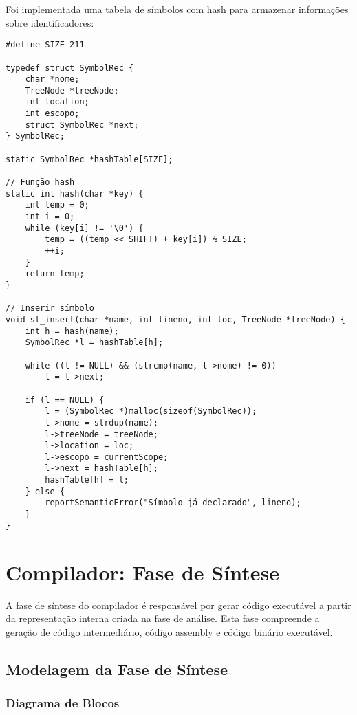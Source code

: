 \documentclass[
	12pt,				%
	oneside,
	a4paper,			%
	english,			%
	french,				%
	spanish,			%
	brazil,				%
	]{abntex2}
\begin{document}
Foi implementada uma tabela de símbolos com hash para armazenar informações sobre identificadores:

\begin{lstlisting}[style=cstyle, caption=Implementação da tabela de símbolos]
#define SIZE 211

typedef struct SymbolRec {
    char *nome;
    TreeNode *treeNode;
    int location;
    int escopo;
    struct SymbolRec *next;
} SymbolRec;

static SymbolRec *hashTable[SIZE];

// Função hash
static int hash(char *key) {
    int temp = 0;
    int i = 0;
    while (key[i] != '\0') {
        temp = ((temp << SHIFT) + key[i]) % SIZE;
        ++i;
    }
    return temp;
}

// Inserir símbolo
void st_insert(char *name, int lineno, int loc, TreeNode *treeNode) {
    int h = hash(name);
    SymbolRec *l = hashTable[h];
    
    while ((l != NULL) && (strcmp(name, l->nome) != 0))
        l = l->next;
        
    if (l == NULL) {
        l = (SymbolRec *)malloc(sizeof(SymbolRec));
        l->nome = strdup(name);
        l->treeNode = treeNode;
        l->location = loc;
        l->escopo = currentScope;
        l->next = hashTable[h];
        hashTable[h] = l;
    } else {
        reportSemanticError("Símbolo já declarado", lineno);
    }
}
\end{lstlisting}

\chapter{Compilador: Fase de Síntese}

A fase de síntese do compilador é responsável por gerar código executável a partir da representação interna criada na fase de análise. Esta fase compreende a geração de código intermediário, código assembly e código binário executável.

\section{Modelagem da Fase de Síntese}

\subsection{Diagrama de Blocos}
\end{document}
